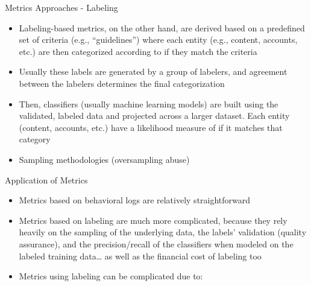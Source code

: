 \documentclass[nobackground,dvipsnames,table]{beamer}
\begin{document}
\begin{frame}{Metrics Approaches - Labeling}

\begin{itemize}
    \item Labeling-based metrics, on the other hand, are derived based on a predefined set of criteria (e.g., “guidelines”) where each entity (e.g., content, accounts, etc.) are then categorized according to if they match the criteria
    \item Usually these labels are generated by a group of labelers, and agreement between the labelers determines the final categorization
    \item Then, classifiers (usually machine learning models) are built using the validated, labeled data and projected across a larger dataset. Each entity (content, accounts, etc.) have a likelihood measure of if it matches that category
    \item Sampling methodologies (oversampling abuse)
\end{itemize}
\end{frame}

\begin{frame}{Application of Metrics}
\small{
\begin{itemize}
    \item Metrics based on behavioral logs are relatively straightforward
    \item Metrics based on labeling are much more complicated, because they rely heavily on the sampling of the underlying data, the labels’ validation (quality assurance), and the precision/recall of the classifiers when modeled on the labeled training data… as well as the financial cost of labeling too
    \item Metrics using labeling can be complicated due to:

    
\end{itemize}
}
\end{frame}
\end{document}
